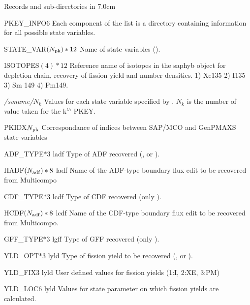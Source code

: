 

\begin{DescriptionEnregistrement}{Records and sub-directories
 in  }{7.0cm} \label{tabl:tabsap}
 
\DirlEnr
{PKEY\_INFO}{6}
{Each component of the list is a directory containing information for all possible state variables.}  
  
\CharEnr
 {STATE\_VAR}{$(N_{\rm pk})*12$} {Name of state variables ().}

\CharEnr
 {ISOTOPES}{$(4)*12$} {Reference name of isotopes in the saphyb object for depletion chain, recovery of fission yield and number densities. 1) Xe135 2) I135 3) Sm 149 4) Pm149.}
  
\RealEnr
 {\textit{/svname/}}{$N_{k}$}{ }
 {Values for each state variable specified by , $N_{k}$ is the number of value taken for the k$^{th}$ PKEY. }  
 
\IntEnr
 {PKIDX}{$N_{\rm pk}$}
 {Correspondance of indices between SAP/MCO and GenPMAXS state variables}

\OptCharEnr 
 {ADF\_TYPE}{$*3$} {ladf}  {Type of ADF recovered (,  or ).}

\OptCharEnr
 {HADF}{$(N_{\rm adf})*8$} {ladf} {Name of the ADF-type boundary flux edit to be recovered from Multicompo }    

\OptCharEnr
 {CDF\_TYPE}{$*3$} {lcdf} {Type of CDF recovered (only ).}

\OptCharEnr
 {HCDF}{$(N_{\rm adf})*8$} {lcdf} {Name of the CDF-type boundary flux edit to be recovered from Multicompo.}    
 
 \OptCharEnr
 {GFF\_TYPE}{$*3$} {lgff} {Type of GFF recovered (only ).}

 \OptCharEnr
 {YLD\_OPT}{$*3$} {lyld} {Type of fission yield to be recovered (, or ).}

 \OptRealEnr
 {YLD\_FIX}{$3$} {lyld} {} {User defined values for fission yields (1:I, 2:XE, 3:PM)}

  \OptRealEnr
 {YLD\_LOC}{$6$} {lyld} {} {Values for state parameter on which fission yields are calculated.}

 \end{DescriptionEnregistrement}
 
